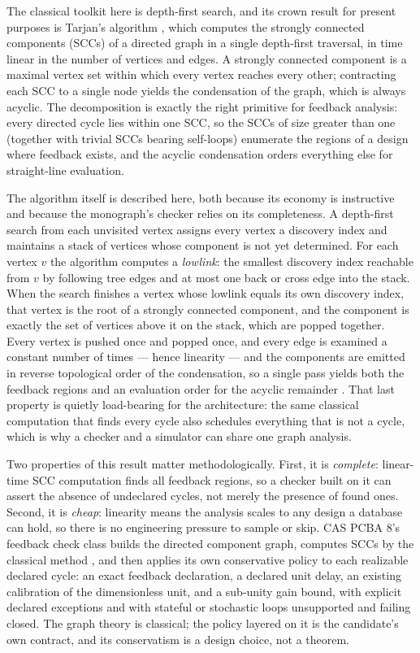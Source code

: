 The classical toolkit here is depth-first search, and its crown result for
present purposes is Tarjan's algorithm \cite{tarjan}, which computes the
strongly connected components (SCCs) of a directed graph in a single
depth-first traversal, in time linear in the number of vertices and
edges. A strongly connected component is a maximal vertex set within
which every vertex reaches every other; contracting each SCC to a single
node yields the condensation of the graph, which is always acyclic. The
decomposition is exactly the right primitive for feedback analysis:
every directed cycle lies within one SCC, so the SCCs of size greater
than one (together with trivial SCCs bearing self-loops) enumerate the
regions of a design where feedback exists, and the acyclic condensation
orders everything else for straight-line evaluation.

The algorithm itself is described here, both because its
economy is instructive and because the monograph's checker relies on its
completeness. A depth-first search from each unvisited vertex assigns
every vertex a discovery index and maintains a stack of vertices whose
component is not yet determined. For each vertex $v$ the algorithm
computes a \emph{lowlink}: the smallest discovery index reachable from
$v$ by following tree edges and at most one back or cross edge into the
stack. When the search finishes a vertex whose lowlink equals its own
discovery index, that vertex is the root of a strongly connected
component, and the component is exactly the set of vertices above it on
the stack, which are popped together. Every vertex is pushed once and
popped once, and every edge is examined a constant number of times ---
hence linearity --- and the components are emitted in reverse
topological order of the condensation, so a single pass yields both the
feedback regions and an evaluation order for the acyclic remainder
\cite{tarjan}. That last property is quietly load-bearing for the
architecture: the same classical computation that finds every cycle also
schedules everything that is not a cycle, which is why a checker and a
simulator can share one graph analysis.

Two properties of this result matter methodologically. First, it is
\emph{complete}: linear-time SCC computation finds all feedback regions,
so a checker built on it can assert the absence of undeclared cycles, not
merely the presence of found ones. Second, it is \emph{cheap}: linearity
means the analysis scales to any design a database can hold, so there is
no engineering pressure to sample or skip. CAS PCBA 8's feedback check
class builds the directed component graph, computes SCCs by the classical
method \cite{tarjan}, and then applies its own conservative policy to
each realizable declared cycle: an exact feedback declaration, a declared
unit delay, an existing calibration of the dimensionless unit, and a sub-unity gain
bound, with explicit declared exceptions and with stateful or stochastic
loops unsupported and failing closed. The graph theory is classical; the
policy layered on it is the candidate's own contract, and its
conservatism is a design choice, not a theorem.

